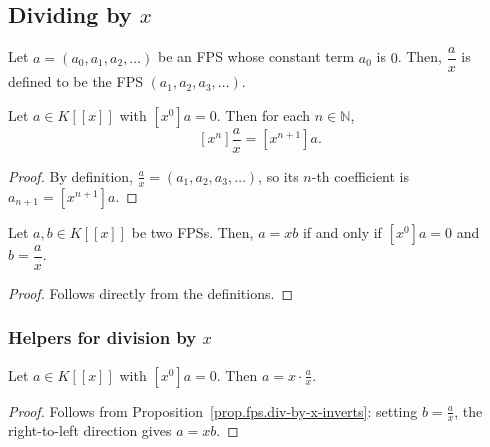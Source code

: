 \subsection{Dividing by $x$}

\begin{definition}
\label{def.fps.div-by-x}
\leantarget
\leanok
Let $a=\left(a_{0},a_{1},a_{2},\ldots\right)$ be
an FPS whose constant term $a_{0}$ is $0$. Then, $\dfrac{a}{x}$ is defined to
be the FPS $\left(a_{1},a_{2},a_{3},\ldots\right)$.
\end{definition}

\begin{lemma}
\label{lem.fps.coeff-divByX}
\leanhelper
\leanok
Let $a\in K[[x]]$ with $[x^0]a=0$. Then for each $n\in\mathbb{N}$,
\[
\left[x^{n}\right]\frac{a}{x} = \left[x^{n+1}\right]a.
\]
\end{lemma}

\begin{proof}
\leanok
By definition, $\frac{a}{x}=(a_1,a_2,a_3,\ldots)$, so its $n$-th coefficient
is $a_{n+1}=[x^{n+1}]a$.
\end{proof}

\begin{proposition}
\label{prop.fps.div-by-x-inverts}
\leantarget
\leanok
Let $a,b\in K[[x]]$ be two FPSs. Then, $a=xb$ if
and only if $\left[x^{0}\right]a=0$ and $b=\dfrac{a}{x}$.
\end{proposition}

\begin{proof}
\leanok
Follows directly from the definitions.
\end{proof}

\subsubsection{Helpers for division by $x$}

\begin{lemma}
\label{lem.fps.eq-X-mul-divByX}
\leanhelper
\leanok
Let $a\in K[[x]]$ with $[x^0]a=0$. Then $a = x\cdot\frac{a}{x}$.
\end{lemma}

\begin{proof}
\leanok
Follows from Proposition~\ref{prop.fps.div-by-x-inverts}: setting
$b=\frac{a}{x}$, the right-to-left direction gives $a=xb$.
\end{proof}

